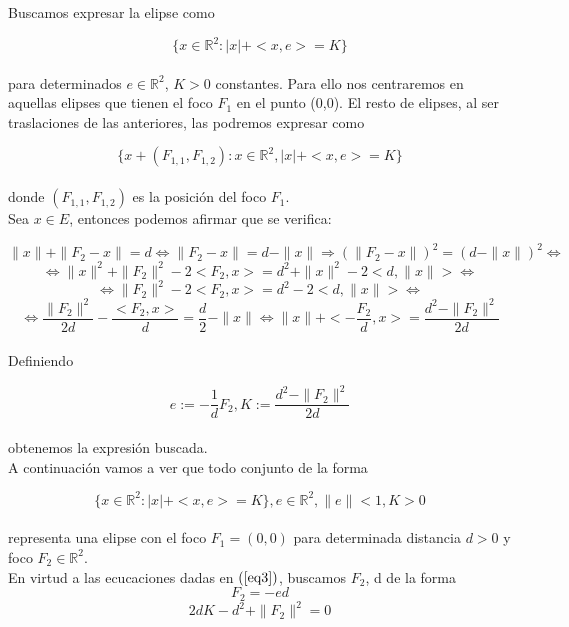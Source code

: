 \documentclass[12pt]{article}
\begin{document}
Buscamos expresar la elipse como 

\begin{equation} \{ x \in \mathbb{R}^2 : |x| +  <x,e> = K \}  \label{eq2}\end{equation}\\

para determinados $e\in \mathbb{R}^2$, $K>0$ constantes. Para ello nos centraremos en aquellas elipses que tienen el foco $F_1$ en el punto (0,0). El resto de elipses, al ser traslaciones de las anteriores, las podremos expresar como 

$$  \{ x + (F_{1,1},F_{1,2}): x \in \mathbb{R}^2, |x| +  <x,e> = K \} $$  \\
    
donde $(F_{1,1},F_{1,2})$ es la posición del foco $F_1$.\\



Sea $x \in E$, entonces podemos afirmar que se verifica:

$$\|x\| + \|F_2 - x\| = d \Leftrightarrow   \|F_2 - x\| = d - \|x\| \Rightarrow (\|F_2 - x\|)^2 = (d - \|x\|)^2 \Leftrightarrow $$
$$\Leftrightarrow \|x\|^2 + \|F_2\|^2 - 2 <F_2, x> = d^2 + \|x\|^2 -2 <d,\|x\|>  \Leftrightarrow $$
$$\Leftrightarrow \|F_2\|^2 - 2 <F_2, x> = d^2 -2 <d,\|x\|> \Leftrightarrow$$
$$\Leftrightarrow \frac{\|F_2\|^2}{2d} - \frac{<F_2, x>}{d} = \frac{d}{2} -\|x\| \Leftrightarrow \|x\| +  < -\frac{F_2}{d}, x> = \frac{d^2-\|F_2\|^2}{2d}$$\\


Definiendo 

\begin{equation}e := -\frac{1}{d}F_2, K:=\frac{d^2-\|F_2\|^2}{2d}  \label{eq3}\end{equation}\\

obtenemos la expresión buscada.\\


A continuación vamos a ver que todo conjunto de la forma 

$$ \{ x \in \mathbb{R}^2 : |x| +  <x,e> = K \}, e \in \mathbb{R}^2, \|e\| < 1, K > 0$$  \\


representa una elipse con el foco $F_1 = (0,0)$ para determinada distancia $d > 0$ y foco $F_2\in \mathbb{R}^2$.\\


En virtud a las ecucaciones dadas en $(\ref{eq3})$, buscamos $F_2$, d de la forma 
\begin{equation}F_2 = -ed  \label{eq4}\end{equation}
\begin{equation}2dK -d^2 + \|F_2\|^2 = 0  \label{eq5}\end{equation}\\
\end{document}
